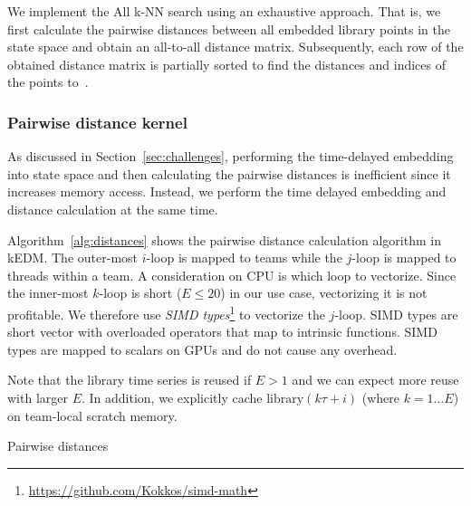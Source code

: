 \documentclass[conference]{IEEEtran}
\begin{document}
We implement the All k-NN search using an exhaustive approach. That is, we
first calculate the pairwise distances between all embedded library points in
the state space and obtain an all-to-all distance matrix. Subsequently, each
row of the obtained distance matrix is partially sorted to find the distances
and indices of the points
to~\cite{Garcia2008,Garcia2010}.

\cite{Johnson2019}
\cite{Shanbhag2018}

\subsubsection{Pairwise distance kernel}
As discussed in Section~\ref{sec:challenges}, performing the time-delayed
embedding into state space and then calculating the pairwise distances is
inefficient since it increases memory access. Instead, we perform the time
delayed embedding and distance calculation at the same time.

Algorithm~\ref{alg:distances} shows the pairwise distance calculation
algorithm in kEDM\@. The outer-most $i$-loop is mapped to teams while the
$j$-loop is mapped to threads within a team. A consideration on CPU is which
loop to vectorize. Since the inner-most $k$-loop is short ($E \leq 20$) in our
use case, vectorizing it is not profitable. We therefore use \textit{SIMD
types}\footnote{\url{https://github.com/Kokkos/simd-math}} to vectorize the
$j$-loop. SIMD types are short vector with overloaded operators that map to
intrinsic functions. SIMD types are mapped to scalars on GPUs and do not cause
any overhead.

Note that the library time series is reused if $E > 1$ and we can expect
more reuse with larger $E$. In addition, we explicitly cache $\mathrm{library}
(k \tau + i)$ (where $k=1 \dots E$) on team-local scratch memory.

\begin{algorithm}
    \SetAlgoLined
    \DontPrintSemicolon
    \caption{Pairwise distances}%
    \label{alg:distances}
\end{algorithm}
\end{document}
